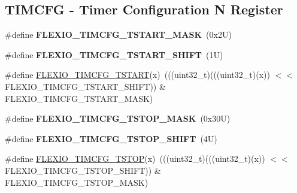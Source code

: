\subsection*{T\+I\+M\+C\+FG -\/ Timer Configuration N Register}
\begin{DoxyCompactItemize}
\item 
\mbox{\label{group___f_l_e_x_i_o___register___masks_ga921f082d6013cac35c2bb576982f4c65}} 
\#define {\bfseries F\+L\+E\+X\+I\+O\+\_\+\+T\+I\+M\+C\+F\+G\+\_\+\+T\+S\+T\+A\+R\+T\+\_\+\+M\+A\+SK}~(0x2\+U)
\item 
\mbox{\label{group___f_l_e_x_i_o___register___masks_ga097d0a2054785f636a36ba853aa86185}} 
\#define {\bfseries F\+L\+E\+X\+I\+O\+\_\+\+T\+I\+M\+C\+F\+G\+\_\+\+T\+S\+T\+A\+R\+T\+\_\+\+S\+H\+I\+FT}~(1\+U)
\item 
\#define \mbox{\hyperlink{group___f_l_e_x_i_o___register___masks_ga0537e58d857a206ab42811b32aa4480a}{F\+L\+E\+X\+I\+O\+\_\+\+T\+I\+M\+C\+F\+G\+\_\+\+T\+S\+T\+A\+RT}}(x)~(((uint32\+\_\+t)(((uint32\+\_\+t)(x)) $<$$<$ F\+L\+E\+X\+I\+O\+\_\+\+T\+I\+M\+C\+F\+G\+\_\+\+T\+S\+T\+A\+R\+T\+\_\+\+S\+H\+I\+FT)) \& F\+L\+E\+X\+I\+O\+\_\+\+T\+I\+M\+C\+F\+G\+\_\+\+T\+S\+T\+A\+R\+T\+\_\+\+M\+A\+SK)
\item 
\mbox{\label{group___f_l_e_x_i_o___register___masks_ga09b0b0b2e7a6553ca3189e8b0c641ce1}} 
\#define {\bfseries F\+L\+E\+X\+I\+O\+\_\+\+T\+I\+M\+C\+F\+G\+\_\+\+T\+S\+T\+O\+P\+\_\+\+M\+A\+SK}~(0x30\+U)
\item 
\mbox{\label{group___f_l_e_x_i_o___register___masks_ga6342e95fb7c9632d2fd2231fa2e54bca}} 
\#define {\bfseries F\+L\+E\+X\+I\+O\+\_\+\+T\+I\+M\+C\+F\+G\+\_\+\+T\+S\+T\+O\+P\+\_\+\+S\+H\+I\+FT}~(4\+U)
\item 
\#define \mbox{\hyperlink{group___f_l_e_x_i_o___register___masks_ga47f093415677944705c75e7eb79f7740}{F\+L\+E\+X\+I\+O\+\_\+\+T\+I\+M\+C\+F\+G\+\_\+\+T\+S\+T\+OP}}(x)~(((uint32\+\_\+t)(((uint32\+\_\+t)(x)) $<$$<$ F\+L\+E\+X\+I\+O\+\_\+\+T\+I\+M\+C\+F\+G\+\_\+\+T\+S\+T\+O\+P\+\_\+\+S\+H\+I\+FT)) \& F\+L\+E\+X\+I\+O\+\_\+\+T\+I\+M\+C\+F\+G\+\_\+\+T\+S\+T\+O\+P\+\_\+\+M\+A\+SK)
\item 
\mbox{\label{group___f_l_e_x_i_o___register___masks_ga64f435d9f08f382279adc7abc11aed02}} 

\end{DoxyCompactItemize}
